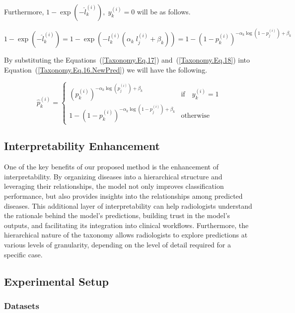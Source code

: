 \documentclass[preprint,3p,times, review]{elsarticle}
\begin{document}
Furthermore, $1-\exp{\left(-{\widehat l}_k^{(i)}\right)},\;y_k^{(i)}=0 $ will be as follows.

\begin{equation}
    \label{Taxonomy.Eq.18}
    1-\exp{\left(-{\widehat l}_k^{(i)}\right)}=1-\exp{\left(-l_k^{(i)}\left(\alpha_k\;l_j^{(i)}+\beta_k\right)\right)}={1-\left(1-p_k^{(i)}\right)}^{-\alpha_k{\log{\left(1-p_j^{(i)}\right)}}+\beta_k}
\end{equation}


By substituting the Equations~(\ref{Taxonomy.Eq.17}) and~(\ref{Taxonomy.Eq.18})  into Equation~(\ref{Taxonomy.Eq.16.NewPred})  we will have the following.


\begin{equation}
    \label{Taxonomy.Eq.19.NewPred}
    \widehat{p}_k^{(i)} =
    \begin{cases}
        (p_k^{(i)})^{-\alpha_k \log(p_j^{(i)}) + \beta_k} & \text{if} \quad y_k^{(i)} = 1 \\
        1 - (1 - p_k^{(i)})^{-\alpha_k \log(1 - p_j^{(i)}) + \beta_k} & \text{otherwise}
    \end{cases}
\end{equation}


\subsection{Interpretability Enhancement}

One of the key benefits of our proposed method is the enhancement of interpretability. By organizing diseases into a hierarchical structure and leveraging their relationships, the model not only improves classification performance, but also provides insights into the relationships among predicted diseases. This additional layer of interpretability can help radiologists understand the rationale behind the model's predictions, building trust in the model's outputs, and facilitating its integration into clinical workflows. Furthermore, the hierarchical nature of the taxonomy allows radiologists to explore predictions at various levels of granularity, depending on the level of detail required for a specific case.



\subsection{Experimental Setup}


\subsubsection{Datasets}
\end{document}
